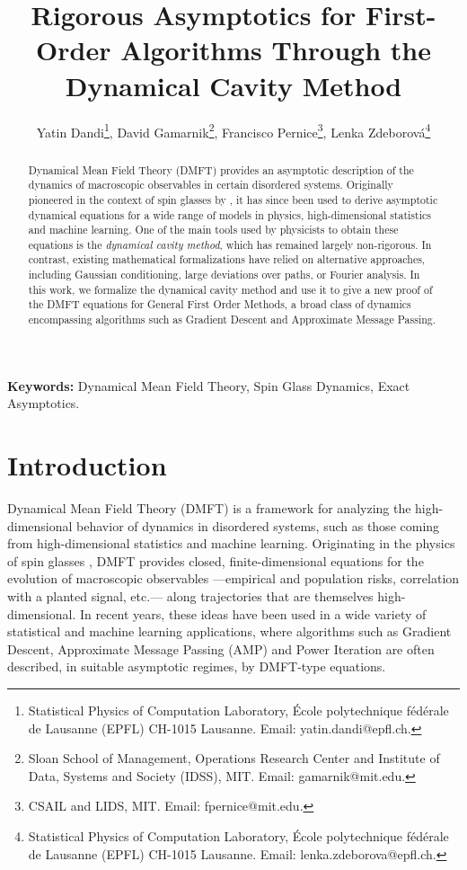 \documentclass{article}
\title{Rigorous Asymptotics for First-Order Algorithms
Through the Dynamical Cavity Method}
\author{Yatin Dandi\thanks{Statistical Physics of Computation Laboratory, École polytechnique fédérale de Lausanne (EPFL) CH-1015 Lausanne. Email: yatin.dandi@epfl.ch.}, David Gamarnik\thanks{Sloan School of Management, 
Operations Research Center and Institute of Data,  Systems and Society (IDSS), MIT. Email: gamarnik@mit.edu. }, Francisco Pernice\thanks{CSAIL and LIDS, MIT. Email: fpernice@mit.edu.}, Lenka Zdeborová\thanks{Statistical Physics of Computation Laboratory, École polytechnique fédérale de Lausanne (EPFL) CH-1015 Lausanne. Email: lenka.zdeborova@epfl.ch.}}
\date{}
\newcommand{\1}{\mathbbm{1}}
\theoremstyle{plain}
\theoremstyle{definition}
\theoremstyle{remark}
\begin{document}
\maketitle

\begin{abstract}%
Dynamical Mean Field Theory (DMFT) provides an asymptotic description of the dynamics of macroscopic observables in certain disordered systems. Originally pioneered in the context of spin glasses by \cite{sompolinsky1982relaxational}, it has since been used to derive asymptotic dynamical equations for a wide range of models in physics, high-dimensional statistics and machine learning. One of the main tools used by physicists to obtain these equations is the \emph{dynamical cavity method}, which has remained largely non-rigorous. In contrast, existing mathematical formalizations have relied on alternative approaches, including Gaussian conditioning, large deviations over paths, or Fourier analysis. In this work, we formalize the dynamical cavity method and use it to give a new proof of the DMFT equations for General First Order Methods, a broad class of dynamics encompassing algorithms such as Gradient Descent and Approximate Message Passing.
\end{abstract}

\noindent\textbf{Keywords:} Dynamical Mean Field Theory, Spin Glass Dynamics, Exact Asymptotics.

\section{Introduction}

Dynamical Mean Field Theory (DMFT) is a framework for analyzing the high-dimensional behavior of dynamics in disordered systems, such as those coming from high-dimensional statistics and machine learning. Originating in the physics of spin glasses \cite{sompolinsky1982relaxational, cugliandolo1993analytical}, DMFT provides closed, finite-dimensional equations for the evolution of macroscopic observables ---empirical and population risks, correlation with a planted signal, etc.--- along trajectories that are themselves high-dimensional. In recent years, these ideas have been used in a wide variety of statistical and machine learning applications, where algorithms such as Gradient Descent, Approximate Message Passing (AMP) and Power Iteration are often described, in suitable asymptotic regimes, by DMFT-type equations.
\end{document}
